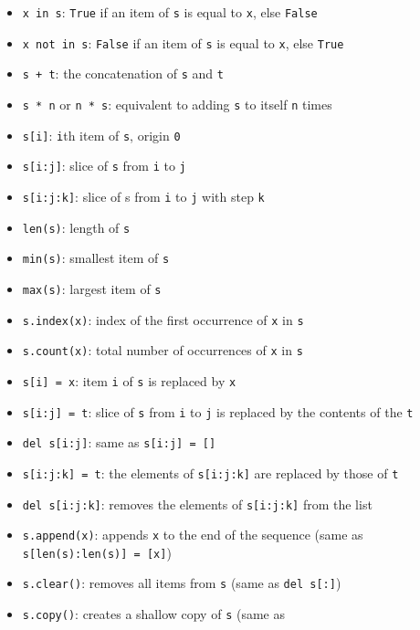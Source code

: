 \documentclass[12pt]{article} \newif\ifsolution\solutiontrue %
\begin{document}
\begin{itemize}
\item
  \texttt{x\ in\ s}: \texttt{True} if an item of \texttt{s} is equal to
  \texttt{x}, else \texttt{False}
\item
  \texttt{x\ not\ in\ s}: \texttt{False} if an item of \texttt{s} is
  equal to \texttt{x}, else \texttt{True}
\item
  \texttt{s\ +\ t}: the concatenation of \texttt{s} and \texttt{t}
\item
  \texttt{s\ *\ n} or \texttt{n\ *\ s}: equivalent to adding \texttt{s}
  to itself \texttt{n} times
\item
  \texttt{s{[}i{]}}: \texttt{i}th item of \texttt{s}, origin \texttt{0}
\item
  \texttt{s{[}i:j{]}}: slice of \texttt{s} from \texttt{i} to \texttt{j}
\item
  \texttt{s{[}i:j:k{]}}: slice of s from \texttt{i} to \texttt{j} with
  step \texttt{k}
\item
  \texttt{len(s)}: length of \texttt{s}
\item
  \texttt{min(s)}: smallest item of \texttt{s}
\item
  \texttt{max(s)}: largest item of \texttt{s}
\item
  \texttt{s.index(x)}: index of the first occurrence of \texttt{x} in
  \texttt{s}
\item
  \texttt{s.count(x)}: total number of occurrences of \texttt{x} in
  \texttt{s}
\item
  \texttt{s{[}i{]}\ =\ x}: item \texttt{i} of \texttt{s} is replaced by
  \texttt{x}
\item
  \texttt{s{[}i:j{]}\ =\ t}: slice of \texttt{s} from \texttt{i} to
  \texttt{j} is replaced by the contents of the \texttt{t}
\item
  \texttt{del\ s{[}i:j{]}}: same as \texttt{s{[}i:j{]}\ =\ {[}{]}}
\item
  \texttt{s{[}i:j:k{]}\ =\ t}: the elements of \texttt{s{[}i:j:k{]}} are
  replaced by those of \texttt{t}
\item
  \texttt{del\ s{[}i:j:k{]}}: removes the elements of
  \texttt{s{[}i:j:k{]}} from the list
\item
  \texttt{s.append(x)}: appends \texttt{x} to the end of the sequence
  (same as \texttt{s{[}len(s):len(s){]}\ =\ {[}x{]}})
\item
  \texttt{s.clear()}: removes all items from \texttt{s} (same as
  \texttt{del\ s{[}:{]}})
\item
  \texttt{s.copy()}: creates a shallow copy of \texttt{s} (same as

\end{itemize}
\end{document}
